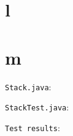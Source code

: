 \documentclass[11pt]{article}
\begin{document}
\section*{l}


\section*{m}
\texttt{Stack.java}:

\texttt{StackTest.java}:

\texttt{Test results}:

\end{document}
